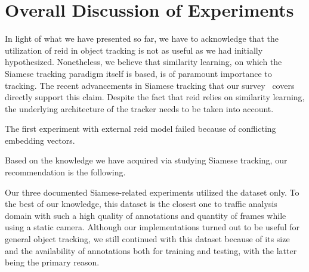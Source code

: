\section{Overall Discussion of Experiments}
\label{sec:ExperimentsDisucssion}


In light of what we have presented so far, we have to acknowledge that the utilization of \gls{reid} in object tracking is not as useful as we had initially hypothesized. Nonetheless, we believe that similarity learning, on which the Siamese tracking paradigm itself is based, is of paramount importance to tracking. The recent advancements in Siamese tracking that our survey~\cite{ondrasovic2021siamese} covers directly support this claim. Despite the fact that \gls{reid} relies on similarity learning, the underlying architecture of the tracker needs to be taken into account.

The first experiment with external \gls{reid} model failed because of conflicting embedding vectors.

Based on the knowledge we have acquired via studying Siamese tracking, our recommendation is the following.

Our three documented Siamese-related experiments utilized the \uadetrac{} dataset only. To the best of our knowledge, this dataset is the closest one to traffic analysis domain with such a high quality of annotations and quantity of frames while using a static camera. Although our implementations turned out to be useful for general object tracking, we still continued with this dataset because of its size and the availability of annotations both for training and testing, with the latter being the primary reason.

